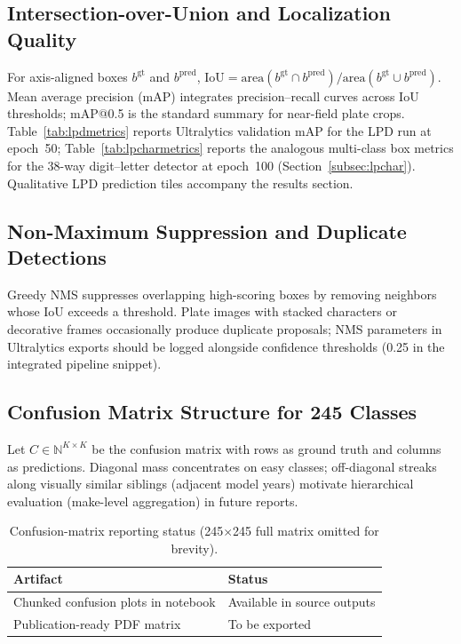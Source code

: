 \subsection{Intersection-over-Union and Localization Quality}
For axis-aligned boxes $b^{\mathrm{gt}}$ and $b^{\mathrm{pred}}$, $\mathrm{IoU} = \mathrm{area}(b^{\mathrm{gt}} \cap b^{\mathrm{pred}}) / \mathrm{area}(b^{\mathrm{gt}} \cup b^{\mathrm{pred}})$. Mean average precision (mAP) integrates precision--recall curves across IoU thresholds; mAP@0.5 is the standard summary for near-field plate crops. Table~\ref{tab:lpdmetrics} reports Ultralytics validation mAP for the LPD run at epoch~50; Table~\ref{tab:lpcharmetrics} reports the analogous multi-class box metrics for the 38-way digit--letter detector at epoch~100 (Section~\ref{subsec:lpchar}). Qualitative LPD prediction tiles accompany the results section.

\subsection{Non-Maximum Suppression and Duplicate Detections}
Greedy NMS suppresses overlapping high-scoring boxes by removing neighbors whose IoU exceeds a threshold. Plate images with stacked characters or decorative frames occasionally produce duplicate proposals; NMS parameters in Ultralytics exports should be logged alongside confidence thresholds (0.25 in the integrated pipeline snippet).

\subsection{Confusion Matrix Structure for 245 Classes}
Let $C \in \mathbb{N}^{K\times K}$ be the confusion matrix with rows as ground truth and columns as predictions. Diagonal mass concentrates on easy classes; off-diagonal streaks along visually similar siblings (adjacent model years) motivate hierarchical evaluation (make-level aggregation) in future reports.

\begin{table}[!t]
\centering
\caption{Confusion-matrix reporting status (245$\times$245 full matrix omitted for brevity).}
\begin{tabular}{@{}ll@{}}
\toprule
Artifact & Status \\
\midrule
Chunked confusion plots in notebook & Available in source outputs \\
Publication-ready PDF matrix & To be exported \\
\bottomrule
\end{tabular}
\end{table}

